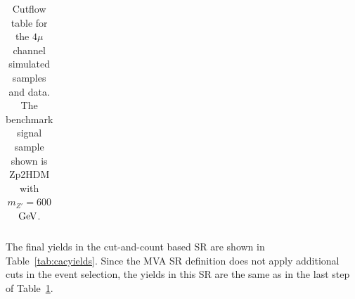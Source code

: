 \begin{table}[htbH]
\begin{center}
{\begin{tabular}{ l | c | c | c | c | c | c | c | c }
\hline
\end{tabular}}
\caption{Cutflow table for the $4\mu$ channel simulated samples and data. The benchmark signal sample shown is Zp2HDM with $m_{Z'}=600$ $\mathrm{Ge\kern -0.1em V}$.}\label{tab:smyields}
\end{center}
\end{table}

The final yields in the cut-and-count based SR are shown in Table~\ref{tab:cacyields}. 
Since the MVA SR definition does not apply additional cuts in the event selection, the yields in this SR are the same as in the last step of Table~\ref{tab:smyields}. 


